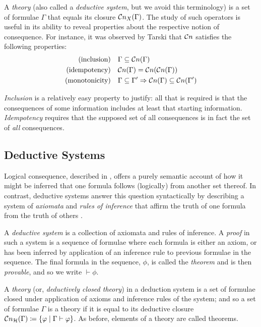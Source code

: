 A \textit{theory} (also called a \textit{deductive system}, but we avoid this terminology) is a set of formulae $\Gamma$ that equals its closure $\mathcal{C}n_X (\Gamma)$. The study of such operators is useful in its ability to reveal properties about the respective notion of consequence. For instance, it was observed by Tarski \cite[p. 84]{tarski1936operator} that $\mathcal{C}n$ satisfies the following properties:
%
\begin{align}
     \text{(inclusion)} & \quad \Gamma \subseteq \mathcal{C}n (\Gamma) \\
     \text{(idempotency)} & \quad  \mathcal{C}n (\Gamma) = \mathcal{C}n (\mathcal{C}n (\Gamma)) \\
     \text{(monotonicity)} & \quad \Gamma \subseteq \Gamma' \Rightarrow \mathcal{C}n (\Gamma) \subseteq \mathcal{C}n (\Gamma') 
\end{align}

\textit{Inclusion} is a relatively easy property to justify: all that is required is that the consequences of some information includes at least that starting information. \textit{Idempotency} requires that the supposed set of all consequences is in fact the set of \textit{all} consequences.  


\subsection{Deductive Systems}
\label{subsection:deduction-systems}
  
Logical consequence, described in , offers a purely semantic account of how it might be inferred that one formula follows (logically) from another set thereof. In contrast, deductive systems answer this question syntactically by describing a system of \textit{axiomata} and \textit{rules of inference} that affirm the truth of one formula from the truth of others \cite[p. 49]{Ben1993Mathematical}. 

\begin{definition}
\label{definition:deductive-system} 
A \textit{deductive system} is a collection of axiomata and rules of inference. A \textit{proof} in such a system is a sequence of formulae where each formula is either an axiom, or has been inferred by application of an inference rule to previous formulae in the sequence. The final formula in the sequence, $\phi$, is called the \textit{theorem} and is then \textit{provable}, and so we write $\vdash \phi$. 

A \textit{theory} (or, \textit{deductively closed theory}) in a deduction system is a set of formulae closed under application of axioms and inference rules of the system; and so a set of formulae $\Gamma$ is a theory if it is equal to its deductive closure $\mathcal{C}n_\mathcal{H} (\Gamma) \coloneqq \{\varphi \mid \Gamma \vdash \varphi \}$. As before, elements of a theory are called theorems. 
\end{definition}

